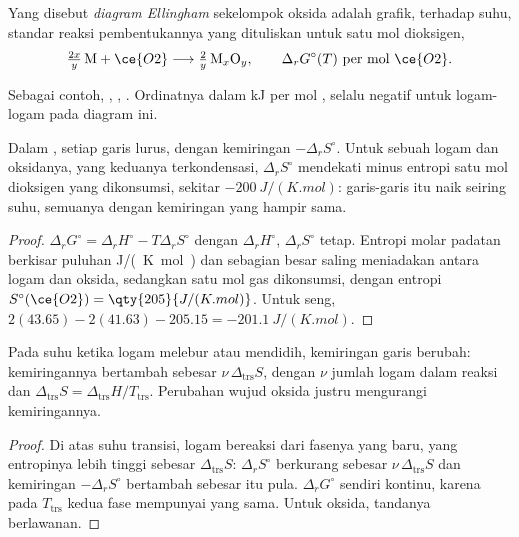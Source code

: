 \begin{definition}\label{def:b2:ellingham:diagram}
Yang disebut \emph{diagram Ellingham} sekelompok
oksida adalah grafik, terhadap suhu,  standar reaksi
pembentukannya yang dituliskan untuk satu mol dioksigen,
\[
  \tfrac{2x}{y}\,\mathrm M + \ce{O2} \longrightarrow \tfrac{2}{y}\,\mathrm{M}_x\mathrm O_y ,
  \qquad \Delta_r G^\circ(T) \ \text{per mol } \ce{O2} .
\]
\end{definition}

Sebagai contoh, , ,
. Ordinatnya dalam \unit{kJ} per mol , selalu
negatif untuk logam-logam pada diagram ini.

\begin{proposition}\label{prop:b2:ellingham:line}
Dalam , setiap garis lurus, dengan kemiringan
$-\Delta_r
S^\circ$. Untuk sebuah logam dan oksidanya, yang keduanya
terkondensasi, $\Delta_r S^\circ$ mendekati minus entropi satu mol
dioksigen yang dikonsumsi, sekitar $-\qty{200}{J/(K.mol)}$: garis-garis
itu naik seiring suhu, semuanya dengan kemiringan yang hampir sama.
\end{proposition}

\begin{proof}
$\Delta_r G^\circ = \Delta_r H^\circ - T\Delta_r S^\circ$ dengan $\Delta_r
H^\circ$, $\Delta_r S^\circ$ tetap. Entropi molar padatan berkisar puluhan
\unit{J/(K.mol)} dan sebagian besar saling meniadakan antara logam dan
oksida, sedangkan satu mol gas dikonsumsi, dengan entropi
$S^\circ(\ce{O2}) = \qty{205}{J/(K.mol)}$. Untuk seng,
$2(43.65) - 2(41.63) - 205.15 = \qty{-201.1}{J/(K.mol)}$.
\end{proof}

\begin{proposition}\label{prop:b2:ellingham:break}
Pada suhu ketika logam melebur atau mendidih, kemiringan garis berubah:
kemiringannya bertambah sebesar $\nu\,\Delta_{\text{trs}}S$, dengan $\nu$
jumlah logam dalam reaksi dan
$\Delta_{\text{trs}}S = \Delta_{\text{trs}}H/T_{\text{trs}}$. Perubahan
wujud oksida justru mengurangi kemiringannya.
\end{proposition}

\begin{proof}
Di atas suhu transisi, logam bereaksi dari fasenya yang baru, yang
entropinya lebih tinggi sebesar $\Delta_{\text{trs}}S$: $\Delta_r S^\circ$
berkurang sebesar $\nu\,\Delta_{\text{trs}}S$ dan kemiringan
$-\Delta_r S^\circ$ bertambah sebesar itu pula. $\Delta_r G^\circ$
sendiri kontinu, karena pada $T_{\text{trs}}$ kedua fase mempunyai
 yang sama. Untuk oksida, tandanya berlawanan.
\end{proof}

